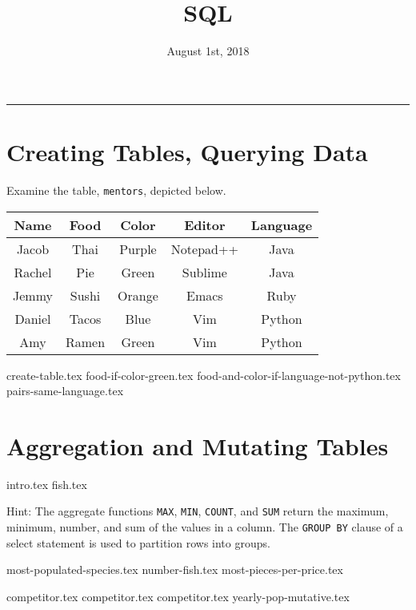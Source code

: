 \documentclass{exam}
\title{\textsc{SQL}}
\date{August 1st, 2018}
\begin{document}
\maketitle
\rule{\textwidth}{0.15em}
\fontsize{12}{15}\selectfont

\section{Creating Tables, Querying Data}
Examine the table, \texttt{mentors}, depicted below.

\begin{center}
\begin{tabular}{|c|c|c|c|c|}
 \hline
 \textbf{Name} & \textbf{Food} & \textbf{Color} & \textbf{Editor} & \textbf{Language} \\
 \hline
 Jacob & Thai & Purple & Notepad++ & Java \\
 \hline
 Rachel & Pie & Green & Sublime & Java \\
 \hline
 Jemmy & Sushi & Orange & Emacs & Ruby \\
 \hline
 Daniel & Tacos & Blue & Vim & Python \\
 \hline
 Amy & Ramen & Green & Vim & Python \\
 \hline
\end{tabular}
\end{center}

\begin{questions}
{create-table.tex}
\newpage
{food-if-color-green.tex}
{food-and-color-if-language-not-python.tex}
{pairs-same-language.tex}
\end{questions}

\newpage
\section{Aggregation and Mutating Tables}
{intro.tex}
{fish.tex}

Hint: The aggregate functions \texttt{MAX}, \texttt{MIN}, \texttt{COUNT}, and \texttt{SUM} return the maximum, minimum, number, and sum of the values in a column. The  \texttt{GROUP BY} clause of a select statement is used to partition rows into groups.

\begin{questions}
{most-populated-species.tex}
{number-fish.tex}
{most-pieces-per-price.tex}

\newpage
{competitor.tex}
{competitor.tex}
{competitor.tex}
{yearly-pop-mutative.tex}
\end{questions}




\end{document}
